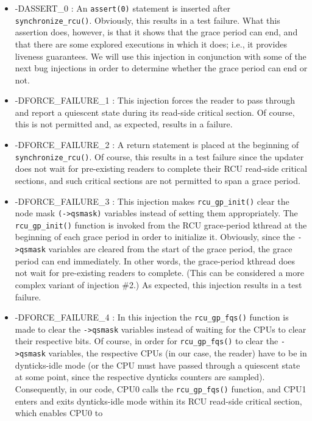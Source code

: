 \begin{itemize}
    

\item
    
-DASSERT\_0 : An \verb|assert(0)| statement is inserted after \verb|synchronize_rcu()|.
 Obviously, this results in a test failure. What this assertion does, however, is that it shows that the
grace period can end, and that there are some explored executions in which it does; i.e., it provides
liveness guarantees. We will use this injection in conjunction with some of
the next bug injections in order to determine whether the grace period can end or not.
\item
-DFORCE\_FAILURE\_1 : This injection forces the reader to pass through and report a quiescent state
during its read-side critical section. Of course, this is not permitted and, as
expected, results in a failure.
\item
-DFORCE\_FAILURE\_2 : A return statement is placed at the beginning of \verb|synchronize_rcu()|. 
Of course, this results in a test failure since the updater does not wait for pre-existing
readers to complete their RCU read-side critical sections, and such critical sections are not 
permitted to span a grace period.
\item
-DFORCE\_FAILURE\_3 : This injection makes \verb|rcu_gp_init()| clear the node mask \verb|(->qsmask)| variables instead of setting them 
appropriately. The \verb|rcu_gp_init()| function is
invoked from the RCU grace-period kthread at the beginning of each grace period in order to initialize it. Obviously, since the \verb|->qsmask| variables are cleared from the start of
the grace period, the grace period can end immediately. In other words, the grace-period kthread does not wait for pre-existing readers to complete. (This can be considered a
more complex variant of injection \#2.) As expected, this injection results in a test failure.
\item
-DFORCE\_FAILURE\_4 : In this injection the \verb|rcu_gp_fqs()| function is made to clear the \verb|->qsmask| variables
instead of waiting for the CPUs to clear their respective bits. Of course,
in order for \verb|rcu_gp_fqs()| to clear the \verb|->qsmask| variables, the respective CPUs (in our case, the reader) 
have to be in dynticks-idle mode (or the CPU must have passed
through a quiescent state at some point, since the respective dynticks counters are sampled). Consequently, 
in our code, CPU0 calls the \verb|rcu_gp_fqs()| function, and CPU1
enters and exits dynticks-idle mode within its RCU read-side critical section, which enables CPU0 to 

\end{itemize}
